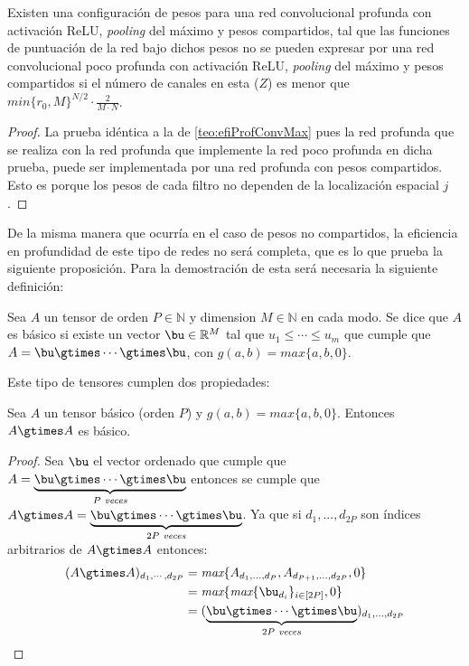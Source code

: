 \begin{teorema}\label{teo:efiProf4}
Existen una configuración de pesos para una red convolucional profunda con activación ReLU, \textit{pooling} del máximo y pesos compartidos, tal que las funciones de puntuación de la red bajo dichos pesos no se pueden expresar por una red convolucional poco profunda con activación ReLU, \textit{pooling} del máximo y pesos compartidos si el número de canales en esta ($Z$) es menor que $\textit{min}\{r_0,M\}^{N/2}\cdot \frac{2}{M\cdot N}$.
\end{teorema}
\begin{proof}
La prueba idéntica a la de \ref{teo:efiProfConvMax} pues la red profunda que se realiza con la red profunda que implemente la red poco profunda en dicha prueba, puede ser implementada por una red profunda con pesos compartidos. Esto es porque los pesos de cada filtro no dependen de la localización espacial $j$.
\end{proof}
De la misma manera que ocurría en el caso de pesos no compartidos, la eficiencia en profundidad de este tipo de redes no será completa, que es lo que prueba la siguiente proposición. Para la demostración de esta será necesaria la siguiente definición:

\begin{definicion}
Sea $A$ un tensor de orden $P\in \mathbb{N}$ y dimension $M\in \mathbb{N}$ en cada modo. Se dice que $A$ es básico si existe un vector $\bu \in \mathbb{R}^M$ tal que $u_1 \leq \cdots  \leq u_m$ que cumple que $A = \bu \gtimes \cdots  \gtimes \bu$, con $g(a,b) = \textit{max}\{a,b,0\}$.
\end{definicion}

Este tipo de tensores cumplen dos propiedades:

\begin{prop}\label{prop:basico1}
Sea $A$ un tensor básico (orden $P$) y $g(a,b) = \textit{max}\{a,b,0\}$. Entonces $A \gtimes A$ es básico.
\end{prop}
\begin{proof}
Sea $\bu$ el vector ordenado que cumple que $A = \underbrace{\bu \gtimes \cdots  \gtimes \bu}_{P \textit{ veces}}$ entonces se cumple que $A \gtimes A = \underbrace{\bu \gtimes \cdots  \gtimes \bu}_{2P \textit{ veces}}$. Ya que si $d_1,... ,d_{2P}$ son índices arbitrarios de $A\gtimes A$ entonces:
\begin{align*}
(A \gtimes A)_{d_1,\cdots ,d_{2P}} &= \textit{max}\{A_{d_1,... ,d_P}, A_{d_{P+
1},... ,d_{2P}},0\}\\ &= \textit{max}\{\textit{max}\{\bu_{d_i}\}_{i\in [2P]},0\} \\&= (\underbrace{\bu \gtimes \cdots  \gtimes \bu}_{2P \textit{ veces}})_{d_1,... ,d_{2P}}
\end{align*}
\end{proof}

